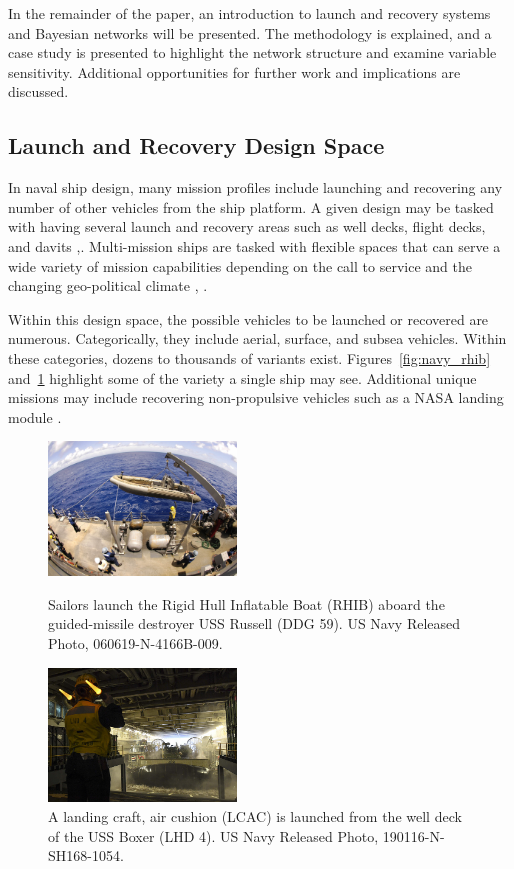 \documentclass{svproc}
\begin{document}
In the remainder of the paper, an introduction to launch and recovery systems and Bayesian networks will be presented. The methodology is explained, and a case study is presented to highlight the network structure and examine variable sensitivity. Additional opportunities for further work and implications are discussed. 

\subsection{Launch and Recovery Design Space}

In naval ship design, many mission profiles include launching and recovering any number of other vehicles from the ship platform. A given design may be tasked with having several launch and recovery areas such as well decks, flight decks, and davits \cite{navy_fact_file},\cite{orourke_navy_2018}. Multi-mission ships are tasked with flexible spaces that can serve a wide variety of mission capabilities depending on the call to service and the changing geo-political climate \cite{orourke_coast_2019}, \cite{orourke_lcs_2018}. 

Within this design space, the possible vehicles to be launched or recovered are numerous. Categorically, they include aerial, surface, and subsea vehicles. Within these categories, dozens to thousands of variants exist. Figures~\ref{fig:navy_rhib} and~\ref{fig:navy_lcac} highlight some of the variety a single ship may see. Additional unique missions may include recovering non-propulsive vehicles such as a NASA landing module \cite{nasa_2018}. 

\begin{figure}[hbt]
	\centering
	\begin{minipage}[b]{0.45\textwidth}
		\includegraphics[width=5cm]{navy_rhib.jpg}
        \caption{Sailors launch the Rigid Hull Inflatable Boat (RHIB) aboard the guided-missile destroyer USS Russell (DDG 59). US Navy Released Photo, 060619-N-4166B-009.}
        \label{fig:navy_rhib}
	\end{minipage}
	\hfill
	\begin{minipage}[b]{0.45\textwidth}
		\includegraphics[width=5cm]{lcac.jpg}
        \caption{A landing craft, air cushion (LCAC) is launched from the well deck of the USS Boxer (LHD 4). US Navy Released Photo, 190116-N-SH168-1054.}
        \label{fig:navy_lcac}
	\end{minipage}
\end{figure}
\end{document}

